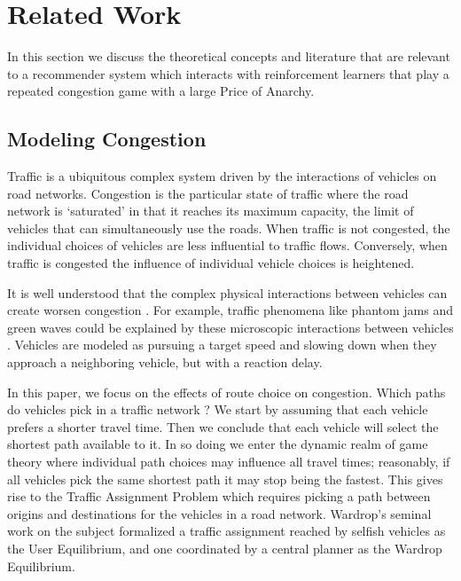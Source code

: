 \section{Related Work}
\label{sec:relatedwork}
In this section we discuss the theoretical concepts and literature that are relevant to a recommender system which interacts with reinforcement learners that play a repeated congestion game with a large Price of Anarchy.

\subsection{Modeling Congestion}

Traffic is a ubiquitous complex system driven by the interactions of vehicles on road networks. Congestion is the particular state of traffic where the road network is `saturated' in that it reaches its maximum capacity, the limit of vehicles that can simultaneously use the roads. When traffic is not congested, the individual choices of vehicles are less influential to traffic flows. Conversely, when traffic is congested the influence of individual vehicle choices is heightened. 

It is well understood that the complex physical interactions between vehicles can create worsen congestion \cite{bando1995dynamical, helbing2002micro}. For example, traffic phenomena like phantom jams and green waves could be explained by these microscopic interactions between vehicles \cite{helbing2001traffic}. Vehicles are modeled as pursuing a target speed and slowing down when they approach a neighboring vehicle, but with a reaction delay. 

In this paper, we focus on the effects of route choice on congestion. Which paths do vehicles pick in a traffic network \cite{wardrop1952road}? We start by assuming that each vehicle prefers a shorter travel time. Then we conclude that each vehicle will select the shortest path available to it. In so doing we enter the dynamic realm of game theory where individual path choices may influence all travel times; reasonably, if all vehicles pick the same shortest path it may stop being the fastest. This gives rise to the Traffic Assignment Problem which requires picking a path between origins and destinations for the vehicles in a road network. Wardrop's seminal work on the subject \cite{wardrop1952road} formalized a traffic assignment reached by selfish vehicles as the User Equilibrium, and one coordinated by a central planner as the Wardrop Equilibrium.

